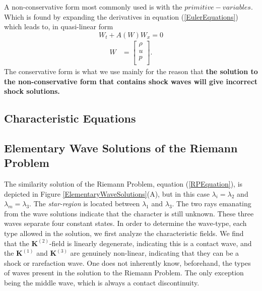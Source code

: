 \documentclass[]{article}
\begin{document}
		A non-conservative form most commonly used is with the $ primitive-variables $. Which is found by expanding the derivatives in equation (\ref{EulerEquations}) which leads to, in quasi-linear form
		\begin{equation}
			W_t + A(W) W_x = 0
		\end{equation}
		\begin{align}
			W &= \begin{bmatrix}
			\rho \\
			u \\
			p \\
			\end{bmatrix}.
			\label{PrimitiveVariables}
		\end{align}	
		The conservative form is what we use mainly for the reason that \textbf{the solution to the non-conservative form that contains shock waves will give incorrect shock solutions.}
		
		
	\subsection{Characteristic Equations}
		
	\subsection{Elementary Wave Solutions of the Riemann Problem}
		
		The similarity solution of the Riemann Problem, equation (\ref{RPEquation}), is depicted in Figure \ref{ElementaryWaveSolutions}(A), but in this case $ \lambda_i = \lambda_2$ and $ \lambda_m = \lambda_3$. The \textit{star-region} is located between $ \lambda_1 $ and $ \lambda_3 $. The two rays emanating from the wave solutions indicate that the character is still unknown. These three waves separate four constant states. In order to determine the wave-type, each type allowed in the solution, we first analyze the characteristic fields. We find that the $ \textbf{K}^{(2)} $-field is linearly degenerate, indicating this is a contact wave, and the $ \textbf{K}^{(1)} $ and $ \textbf{K}^{(3)} $ are genuinely non-linear, indicating that they can be a shock or rarefaction wave. One does not inherently know, beforehand, the types of waves present in the solution to the Riemann Problem. The only exception being the middle wave, which is always a contact discontinuity.
		
\end{document}
